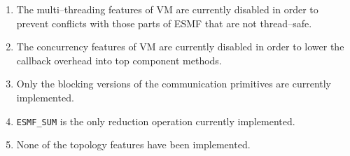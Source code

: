

\begin{enumerate}

\item The multi--threading features of VM are currently disabled in order to prevent conflicts with those parts of ESMF that are not thread--safe.

\item The concurrency features of VM are currently disabled in order to lower the callback overhead into top component methods. 

\item Only the blocking versions of the communication primitives are currently implemented.

\item {\tt ESMF\_SUM} is the only reduction operation currently implemented. 

\item None of the topology features have been implemented.

\end{enumerate}



